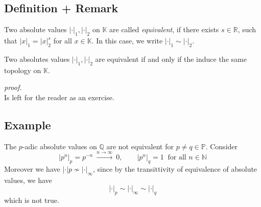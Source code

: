 \documentclass[12pt]{book}
\begin{document}
\begin{spacing}{1.3}
\subsection{Definition + Remark} %
\begin{compactenum}
\item Two absolute values $|\cdot|_1, |\cdot|_2$ on $\mathbb{K}$ are called \textit{equivalent}, if there exists $s \in \mathbb{R}$, such that $|x|_1=|x|_2^s$ for all $x \in \mathbb{K}$. In this case, we write $|\cdot |_1 \sim |\cdot |_2$.
\item Two absolutes values $|\cdot|_1, |\cdot|_2$ are equivalent if and only if the induce the same topology on $\mathbb{K}$.
\end{compactenum}
\textit{proof.}\\
Is left for the reader as an exercise.

\subsection{Example} %
The $p$-adic absolute values on $\mathbb{Q}$ are not equivalent for $p \neq q \in \mathbb{P}$. Consider
$$|p^n|_p = p^{-n} \ \xrightarrow{n \to \infty}\ 0, \qquad |p^n|_q=1 \ \textrm{ for all } n \in \mathbb{N}$$
Moreover we have $|\cdot |p \nsim |\cdot |_{\infty}$, since by the transittivity of equivalence of absolute values, we have
$$|\cdot |_p \sim |\cdot |_{\infty} \sim |\cdot |_{q}$$
which is not true.


\end{spacing}
\end{document}
